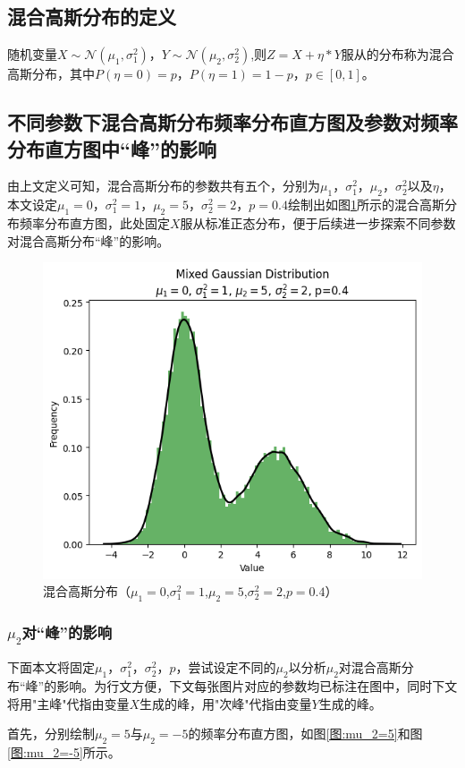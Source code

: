 \documentclass{article}
\begin{document}
\subsection{混合高斯分布的定义}

随机变量$X \sim \mathcal{N}(\mu_1,\sigma_1^2)$，$Y \sim \mathcal{N}(\mu_2,\sigma_2^2)$,则$Z=X+\eta*Y$服从的分布称为混合高斯分布，其中$P(\eta=0)=p$，$P(\eta=1)=1-p$，$p \in [0,1]$。

\subsection{不同参数下混合高斯分布频率分布直方图及参数对频率分布直方图中“峰”的影响}

由上文定义可知，混合高斯分布的参数共有五个，分别为$\mu_1$，$\sigma_1^2$，$\mu_2$，$\sigma_2^2$以及$\eta$，本文设定$\mu_1=0$，$\sigma_1^2=1$，$\mu_2=5$，$\sigma_2^2=2$，$p=0.4$绘制出如图\ref{图:混合高斯分布}所示的混合高斯分布频率分布直方图，此处固定$X$服从标准正态分布，便于后续进一步探索不同参数对混合高斯分布“峰”的影响。

\begin{figure}[H]
\centering
\includegraphics[width=0.5\linewidth]{figure/混合高斯分布.png}
\caption{\label{图:混合高斯分布}混合高斯分布（$\mu_1=0$,$\sigma_1^2=1$,$\mu_2=5$,$\sigma_2^2=2$,$p=0.4$）}
\end{figure}

\subsubsection{\texorpdfstring{$\mu_2$对“峰”的影响}{mu2对“峰”的影响}}

下面本文将固定$\mu_1$，$\sigma_1^2$，$\sigma_2^2$，$p$，尝试设定不同的$\mu_2$以分析$\mu_2$对混合高斯分布“峰”的影响。为行文方便，下文每张图片对应的参数均已标注在图中，同时下文将用"主峰"代指由变量$X$生成的峰，用"次峰"代指由变量$Y$生成的峰。

首先，分别绘制$\mu_2=5$与$\mu_2=-5$的频率分布直方图，如图\ref{图:mu_2=5}和图\ref{图:mu_2=-5}所示。
\end{document}
